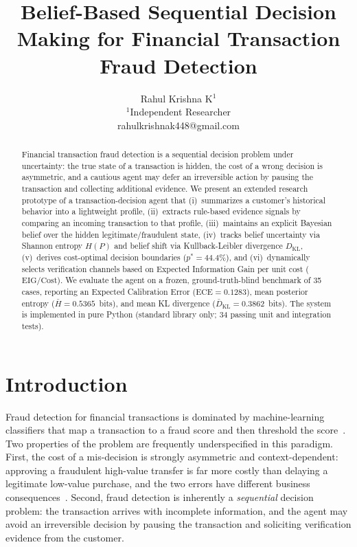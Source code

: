 \documentclass{article}
\title{Belief-Based Sequential Decision Making for Financial Transaction Fraud Detection}
\author{
    Rahul Krishna K$^1$\\
    \affiliations
    $^1$Independent Researcher\\
    \emails
    rahulkrishnak448@gmail.com
}
\begin{document}
\maketitle

\begin{abstract}
Financial transaction fraud detection is a sequential decision problem under
uncertainty: the true state of a transaction is hidden, the cost of a wrong
decision is asymmetric, and a cautious agent may defer an irreversible action
by pausing the transaction and collecting additional evidence. We present an
extended research prototype of a transaction-decision agent that (i)~summarizes a
customer's historical behavior into a lightweight profile, (ii)~extracts
rule-based evidence signals by comparing an incoming transaction to that
profile, (iii)~maintains an explicit Bayesian belief over the hidden
legitimate/fraudulent state, (iv)~tracks belief uncertainty via Shannon entropy $H(P)$ and belief shift via Kullback-Leibler divergence $D_{\text{KL}}$, (v)~derives cost-optimal decision boundaries ($p^* = 44.4\%$), and (vi)~dynamically selects verification channels based on Expected Information Gain per unit cost ($\text{EIG}/\text{Cost}$). We evaluate the agent on a frozen, ground-truth-blind benchmark of 35 cases, reporting an Expected Calibration Error ($\text{ECE} = 0.1283$), mean posterior entropy ($\bar{H} = 0.5365$~bits), and mean KL divergence ($\bar{D}_{\text{KL}} = 0.3862$~bits). The system is implemented in pure Python (standard library only; 34 passing unit and integration tests).
\end{abstract}

\section{Introduction}

Fraud detection for financial transactions is dominated by machine-learning
classifiers that map a transaction to a fraud score and then threshold the
score~\cite{bolton2002,bhattacharyya2011,leborgen2021}. Two properties of the
problem are frequently underspecified in this paradigm. First, the cost of a
mis-decision is strongly asymmetric and context-dependent: approving a
fraudulent high-value transfer is far more costly than delaying a legitimate
low-value purchase, and the two errors have different business
consequences~\cite{bahnsen2013}. Second, fraud detection is inherently a
\emph{sequential} decision problem: the transaction arrives with incomplete
information, and the agent may avoid an irreversible decision by pausing the
transaction and soliciting verification evidence from the customer.
\end{document}
